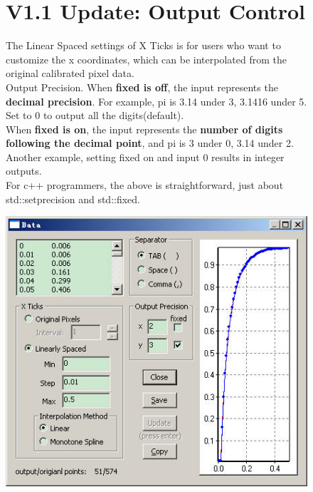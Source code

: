 \documentclass[12pt]{article}
\begin{document}
\begin{figure}
\section{V1.1 Update: Output Control}
  The Linear Spaced settings of X Ticks is for users who want to customize the x coordinates, which can be interpolated from the original calibrated pixel data.
  \\[3ex]
  Output Precision. When \textbf{fixed is off}, the input represents the \textbf{decimal precision}. For example, pi is 3.14 under 3, 3.1416 under 5. Set to 0 to output all the digits(default).
  \\[3ex]
  When \textbf{fixed is on}, the input represents the \textbf{number of digits following the decimal point}, and pi is 3 under 0, 3.14 under 2. Another example, setting fixed on and input 0 results in integer outputs.
  \\[3ex]
  For c++ programmers, the above is straightforward, just about std::setprecision and std::fixed.

  \centering \includegraphics{./tut_files/21_v1p1_update_data_dialog.jpg}
\end{figure}
\end{document}

